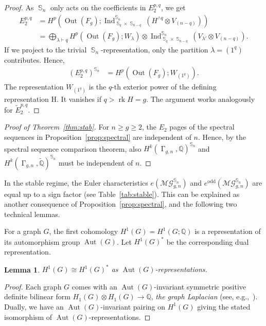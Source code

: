 \documentclass[oneside]{amsart}
\newtheorem{lemma}[theorem]{Lemma}
\theoremstyle{remark}
\newcommand{\Q}{\mathbb{Q}}
\newcommand{\tQ}{\widetilde{\Q}}
\newcommand{\PA}{{\operatorname{\Gamma}}}
\DeclareMathOperator{\SG}{{\mathbb S}}
\newcommand{\Aut}{{\operatorname{Aut}}}
\newcommand{\Out}{{\operatorname{Out}}}
\newcommand{\Ind}{\operatorname{Ind}}
\newcommand{\parts}{\vdash}
\DeclareMathOperator{\rank}{\mathrm{rk}}
\newcommand{\MG}{\mathcal{MG}}
\begin{document}
\begin{proof}
As $\SG_n$ only acts on the coefficients in $E_2^{p,q}$, we get
\begin{align*} E_2^{p,q} &= H^p\left(\Out(F_g); \Ind^{\SG_n}_{\SG_q\times \SG_{n-q}} \left( H^{\wedge q} \otimes V_{(n-q)}\right) \right) \\
 &= \bigoplus_{\lambda \parts q} H^p\left(\Out(F_g); W_\lambda \right) \otimes \Ind^{\SG_n}_{\SG_q\times \SG_{n-q}} \left( V_{\lambda'} \otimes V_{(n-q)}\right). \end{align*}
If we project to the trivial $\SG_n$-representation,
only the partition $\lambda = (1^q)$ contributes. Hence,
\begin{align*} (E_2^{p,q})^{\SG_n} &= H^p\left(\Out(F_g); W_{(1^q)} \right). \end{align*}
The representation $W_{(1^q)}$ is the $q$-th exterior power of the defining representation $\mathrm H$. It vanishes if $q > \rank H = g$.
The argument works analogously for $\widetilde E_2^{p,q}$.
%
%
\end{proof}

\begin{proof}[Proof of Theorem~\ref{thm:stab}]
For $n \geq g \geq 2$, the $E_2$ pages of the spectral sequences in 
Proposition~\ref{prop:spectral}
are independent of $n$.
Hence, by the spectral sequence comparison theorem, also $H^k(\PA_{g,n},\Q)^{\SG_n}$ and $H^k(\PA_{g,n},\tQ)^{\SG_n}$ must be independent of $n$.
\end{proof}

In the stable regime, the Euler characteristics $e(\MG_{g,n}^{\SG_n})$ and $e^\mathrm{odd}(\MG_{g,n}^{\SG_n})$ are equal up to a sign factor (see Table~\ref{tab:stable}). 
This can be explained as another  consequence of Proposition~\ref{prop:spectral},
and the following two technical lemmas.

For a graph $G$, the first cohomology $H^1(G) =H^1(G;\Q)$ is a representation of its automorphism group $\Aut(G)$. Let $H^1(G)^*$ be the corresponding dual representation.
%
\begin{lemma}
\label{lmm:dualrep}
$H^1(G) \cong H^1(G)^*$
as $\Aut(G)$-representations.
\end{lemma}
\begin{proof}
Each graph $G$ comes with an $\Aut(G)$-invariant 
symmetric positive definite bilinear form $H_1(G) \otimes H_1(G) \rightarrow \Q$, \emph{the graph Laplacian} (see, e.g.,~\cite[3.1.1]{baker2011jacobian}). Dually, we have an $\Aut(G)$-invariant pairing on $H^1(G)$ giving the stated isomorphism of $\Aut(G)$-representations.
\end{proof}
\end{document}
